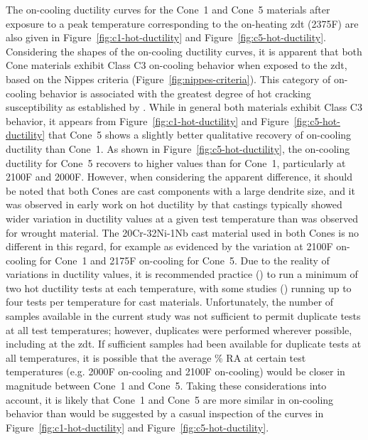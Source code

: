 The on-cooling ductility curves for the Cone~1 and Cone~5 materials after exposure to a peak temperature corresponding to the on-heating \gls{zdt} (2375\textdegree{}F) are also given in Figure~\ref{fig:c1-hot-ductility} and Figure~\ref{fig:c5-hot-ductility}.  Considering the shapes of the on-cooling ductility curves, it is apparent that both Cone materials exhibit Class C3 on-cooling behavior when exposed to the \gls{zdt}, based on the Nippes criteria (Figure~\ref{fig:nippes-criteria}).  This category of on-cooling behavior is associated with the greatest degree of hot cracking susceptibility as established by \citet{nippes_further_1957}.  While in general both materials exhibit Class C3 behavior, it appears from Figure~\ref{fig:c1-hot-ductility} and Figure~\ref{fig:c5-hot-ductility} that Cone~5 shows a slightly better qualitative recovery of on-cooling ductility than Cone~1.  As shown in Figure~\ref{fig:c5-hot-ductility}, the on-cooling ductility for Cone~5 recovers to higher values than for Cone~1, particularly at 2100\textdegree{}F and 2000\textdegree{}F.  However, when considering the apparent difference, it should be noted that both Cones are cast components with a large dendrite size, and it was observed in early work on hot ductility by \citet{nippes_further_1957} that castings typically showed wider variation in ductility values at a given test temperature than was observed for wrought material.  The 20Cr-32Ni-1Nb cast material used in both Cones is no different in this regard, for example as evidenced by the variation at 2100\textdegree{}F on-cooling for Cone~1 and 2175\textdegree{}F on-cooling for Cone~5.  Due to the reality of variations in ductility values, it is recommended practice (\citet{lundin_standardization_1990_experiment}) to run a minimum of two hot ductility tests at each temperature, with some studies (\citet{nippes_further_1957}) running up to four tests per temperature for cast materials.  Unfortunately, the number of samples available in the current study was not sufficient to permit duplicate tests at all test temperatures; however, duplicates were performed wherever possible, including at the \gls{zdt}.  If sufficient samples had been available for duplicate tests at all temperatures, it is possible that the average \% RA at certain test temperatures (e.g. 2000\textdegree{}F on-cooling and 2100\textdegree{}F on-cooling) would be closer in magnitude between Cone~1 and Cone~5.  Taking these considerations into account, it is likely that Cone~1 and Cone~5 are more similar in on-cooling behavior than would be suggested by a casual inspection of the curves in Figure~\ref{fig:c1-hot-ductility} and Figure~\ref{fig:c5-hot-ductility}.

